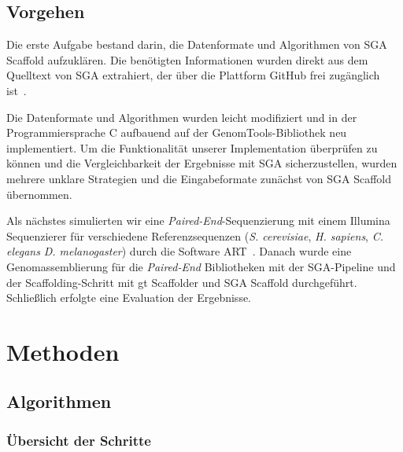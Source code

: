 \documentclass[a4paper,11pt,parskip,abstract=on]{scrartcl}
\begin{document}
\subsection{Vorgehen}
Die erste Aufgabe bestand darin, die Datenformate und Algorithmen
von SGA Scaffold aufzuklären. Die benötigten Informationen
wurden direkt aus dem Quelltext von SGA extrahiert, der über die
Plattform GitHub frei zugänglich ist~\cite{source}.

Die Datenformate und Algorithmen wurden leicht modifiziert und in der
Programmiersprache C aufbauend auf der GenomTools-Bibliothek neu
implementiert. Um die Funktionalität unserer Implementation überprüfen zu
können und die Vergleichbarkeit der Ergebnisse mit SGA sicherzustellen,
wurden mehrere unklare Strategien und die Eingabeformate zunächst von SGA
Scaffold übernommen.

Als nächstes simulierten wir eine \textit{Paired-End}-Sequenzierung mit
einem Illumina Sequenzierer für verschiedene Referenzsequenzen
(\textit{S. cerevisiae}, \textit{H. sapiens}, \textit{C. elegans}
 \textit{D. melanogaster}) durch die Software ART~\cite{Huang:2012kq}.
Danach wurde eine Genomassemblierung für die \textit{Paired-End}
Bibliotheken mit der SGA-Pipeline und der Scaffolding-Schritt
mit gt Scaffolder und SGA Scaffold durchgeführt. Schließlich erfolgte
eine Evaluation der Ergebnisse.

\section{Methoden}
\label{sec: Methoden}

\subsection{Algorithmen}
\subsubsection{Übersicht der Schritte}
\end{document}
